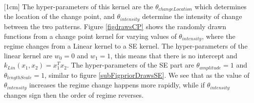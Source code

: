 [1cm]
The hyper-parameters of this kernel are the $\theta_{changeLocation}$ which determines the location of the change point, and $\theta_{intensity}$ determine the intensity of change between the two patterns. Figure \ref{figdrawsCP} shows the randomly drawn functions from a change point kernel for varying values of $\theta_{intensity}$, where the regime changes from a Linear kernel to a SE kernel. The hyper-parameters of the linear kernel are $w_{0}=0$ and $w_{1}=1$, this means that there is no intercept and $k_{Lin}(x_{1}, x_{2}) = x_{1}^T x_{2}$. The hyper-parameters of the SE part are $\theta_{amplitude}=1$ and $\theta_{lengthScale}=1$, similar to figure \ref{subFigpriorDrawsSE}. We see that as the value of $\theta_{intensity}$ increases the regime change happens more rapidly, while if $\theta_{intensity}$ changes sign then the order of regime reverses.

